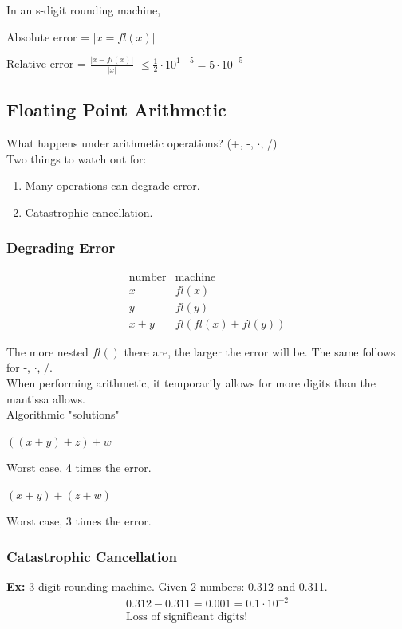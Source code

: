 \documentclass[12pt, letterpaper]{article}
\begin{document}
\noindent In an s-digit rounding machine,
    
Absolute error = $|x=fl(x)|$

Relative error = $\displaystyle \frac{|x-fl(x)|}{|x|}$
    $\le \frac{1}{2} \cdot 10^{1-5} = 5\cdot 10^{-5}$

\subsection{Floating Point Arithmetic}
What happens under arithmetic operations? (+, -, $\cdot$, /) \\

\noindent Two things to watch out for:
\begin{enumerate}[1.]
    \item Many operations can degrade error.
    \item Catastrophic cancellation.
\end{enumerate}

\subsubsection{Degrading Error}
\[\begin{matrix}
    \text{number} & \text{machine} \\
    x & fl(x) \\
    y & fl(y) \\
    x+y & fl(fl(x)+fl(y))
\end{matrix}\]

The more nested $fl()$ there are, the larger the error will be. The same follows for -, $\cdot$, /. \\

When performing arithmetic, it temporarily allows for more digits than the mantissa allows. \\ 

\noindent Algorithmic "solutions"

$((x+y)+z)+w$

Worst case, 4 times the error.

$(x+y)+(z+w)$

Worst case, 3 times the error. 


\subsubsection{Catastrophic Cancellation}
\textbf{Ex: } 3-digit rounding machine. Given 2 numbers: 0.312 and 0.311.
\begin{gather*} 0.312 - 0.311 = 0.001 = 0.1 \cdot 10^{-2} \\ \text{Loss of significant digits!} 
\end{gather*}
\end{document}
